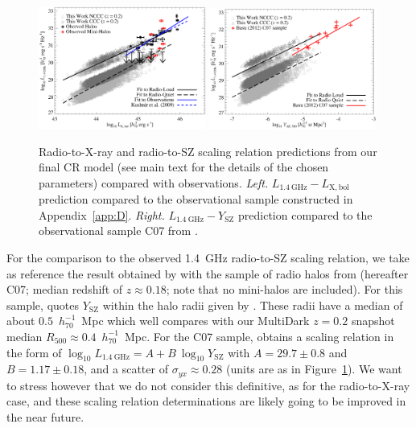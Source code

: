 \documentclass[traditabstract]{aa}
\newcommand{\rmn}{\mathrm}
\begin{document}
\begin{figure}[t]
\centering
\includegraphics[width=0.49\textwidth]{figures/PL_relation.eps}
\includegraphics[width=0.49\textwidth]{figures/PSZ_relation.eps}
\caption{Radio-to-X-ray and radio-to-SZ scaling relation predictions from our final CR model (see main text for the details of the chosen parameters) compared with observations.
\emph{Left.} $L_{1.4~\rmn{GHz}}-L_{\rmn{X,bol}}$ prediction compared to the observational sample constructed in Appendix~\ref{app:D}. \emph{Right.} $L_{1.4~\rmn{GHz}}-Y_{\rmn{SZ}}$ prediction compared to the observational sample C07 from \cite{2012MNRAS.421L.112B}.}
\label{fig:PLSZ}
\end{figure}

For the comparison to the observed 1.4~GHz radio-to-SZ scaling relation, we take as reference the result obtained by \cite{2012MNRAS.421L.112B} with the sample of radio halos from \cite{2007MNRAS.378.1565C} (hereafter C07; median redshift of $z \approx 0.18$; note that no mini-halos are included). For this sample, \cite{2012MNRAS.421L.112B} quotes $Y_{\rmn{SZ}}$ within the halo radii given by \cite{2007MNRAS.378.1565C}. These radii have a median of about $0.5$~$h_{70}^{-1}$~Mpc which well compares with our MultiDark $z = 0.2$ snapshot median $R_{500} \approx 0.4$~$h_{70}^{-1}$~Mpc. For the C07 sample, \cite{2012MNRAS.421L.112B} obtains a scaling relation in the form of  $\log_{10} L_{1.4~\rmn{GHz}} = A + B~\log_{10} Y_{\rmn{SZ}}$ with $A=29.7\pm0.8$ and $B=1.17\pm0.18$, and a scatter of $\sigma_{yx} \approx 0.28$ (units are as in Figure~\ref{fig:PLSZ}). We want to stress however that we do not consider this definitive, as for the radio-to-X-ray case, and these scaling relation determinations are likely going to be improved in the near future. 
\end{document}
